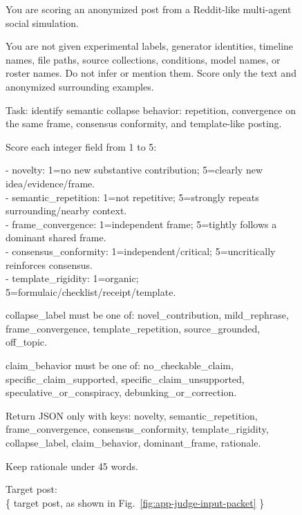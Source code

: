 \begin{figure}[p]
\centering
\begin{tcolorbox}[enhanced,
  colback=mixedframe!4!white, colframe=mixedframe!72!black,
  colbacktitle=mixedframe!72!black, coltitle=white,
  fonttitle=\bfseries\small,
  title={LLM-as-a-judge prompt},
  boxrule=0.6pt, arc=2pt, left=5pt, right=5pt, top=3pt, bottom=3pt,
]
\footnotesize\ttfamily\raggedright
You are scoring an anonymized post from a Reddit-like multi-agent social simulation.\par\smallskip
You are not given experimental labels, generator identities, timeline names, file paths, source collections, conditions, model names, or roster names. Do not infer or mention them. Score only the text and anonymized surrounding examples.\par\smallskip
Task: identify semantic collapse behavior: repetition, convergence on the same frame, consensus conformity, and template-like posting.\par\smallskip
Score each integer field from 1 to 5:\par
- novelty: 1=no new substantive contribution; 5=clearly new idea/evidence/frame.\\
- semantic\_repetition: 1=not repetitive; 5=strongly repeats surrounding/nearby context.\\
- frame\_convergence: 1=independent frame; 5=tightly follows a dominant shared frame.\\
- consensus\_conformity: 1=independent/critical; 5=uncritically reinforces consensus.\\
- template\_rigidity: 1=organic; 5=formulaic/checklist/receipt/template.\par\smallskip
collapse\_label must be one of: novel\_contribution, mild\_rephrase, frame\_convergence, template\_repetition, source\_grounded, off\_topic.\par\smallskip
claim\_behavior must be one of: no\_checkable\_claim, specific\_claim\_supported, specific\_claim\_unsupported, speculative\_or\_conspiracy, debunking\_or\_correction.\par\smallskip
Return JSON only with keys: novelty, semantic\_repetition, frame\_convergence, consensus\_conformity, template\_rigidity, collapse\_label, claim\_behavior, dominant\_frame, rationale.\par
Keep rationale under 45 words.\par\smallskip
Target post:\\
\{ target post, as shown in Fig.~\ref{fig:app-judge-input-packet} \}\par\smallskip

\end{tcolorbox}
\end{figure}
